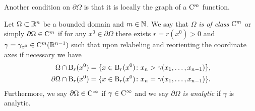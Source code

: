 Another condition on $\partial\Omega$ is that it is locally the graph of a $\mathrm{C}^m$ function.

\begin{defn}
  \label{defn:CmBoundary}
  Let $\Omega \subset \mathbb{R}^n$ be a bounded domain and $m \in \mathbb{N}$.
  We say that $\Omega$ \emph{is of class} $\mathrm{C}^m$ or simply $\partial\Omega \in \mathrm{C}^m$ if for any $x^0 \in \partial \Omega$ there exists $r = r(x^0) > 0$ and $\gamma = \gamma_{x^0} \in \mathrm{C}^m(\mathbb{R}^{n - 1})$ such that upon relabeling and reorienting the coordinate axes if necessary we have
  \begin{align*}
     \Omega \cap \mathrm{B}_r(x^0) &= \{ x \in \mathrm{B}_r(x^0) \colon x_n > \gamma(x_1,\dots,x_{n - 1}) \}, \\
     \partial \Omega \cap \mathrm{B}_r(x^0) &= \{ x \in \mathrm{B}_r(x^0) \colon x_n = \gamma(x_1,\dots,x_{n - 1})\}.
  \end{align*}
  Furthermore, we say $\partial \Omega \in \mathrm{C}^\infty$ if $\gamma \in \mathrm{C}^\infty$ and we say $\partial \Omega$ \emph{is analytic} if $\gamma$ is analytic.
\end{defn}

